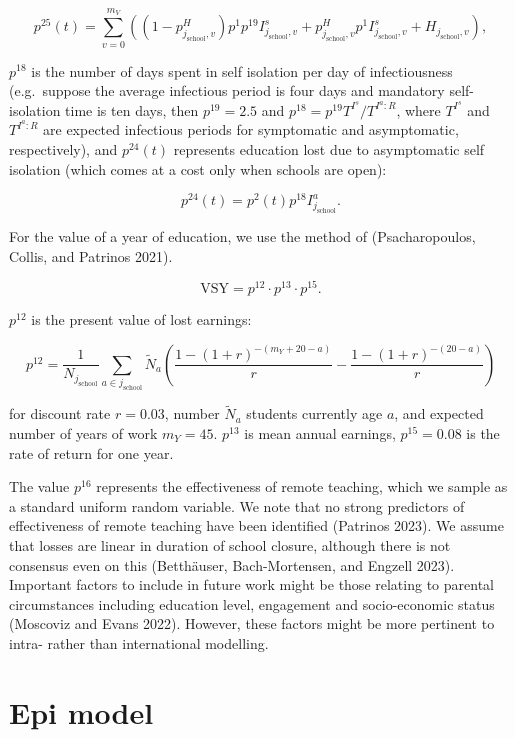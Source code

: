 \documentclass[
]{article}
\begin{document}
\[p^{25}(t)=\sum_{v=0}^{m_V}\left((1-p^H_{j_{\text{school}},v})p^1p^{19}I_{j_{\text{school}},v}^{s}+p^H_{j_{\text{school}},v}p^1I_{j_{\text{school}},v}^{s}+H_{j_{\text{school}},v}\right),\]

\(p^{18}\) is the number of days spent in self isolation per day of infectiousness (e.g.~suppose the average infectious period is four days and mandatory self-isolation time is ten days, then \(p^{19}=2.5\) and \(p^{18}=p^{19}T^{I^s}/T^{I^a:R}\), where \(T^{I^s}\) and \(T^{I^a:R}\) are expected infectious periods for symptomatic and asymptomatic, respectively), and \(p^{24}(t)\) represents education lost due to asymptomatic self isolation (which comes at a cost only when schools are open):

\[p^{24}(t)=p^2(t)p^{18}I_{j_{\text{school}}}^{a}.\]

For the value of a year of education, we use the method of (Psacharopoulos, Collis, and Patrinos 2021).

\[\text{VSY} =  p^{12}\cdot p^{13}\cdot p^{15}.\]

\(p^{12}\) is the present value of lost earnings:

\[p^{12} = \frac{1}{N_{j_{\text{school}}}}\sum_{a\in j_{\text{school}}}\tilde{N}_a\left( \frac{1-(1+r)^{-(m_Y+20-a)}}{r} -  \frac{1-(1+r)^{-(20-a)}}{r}\right)\]

for discount rate \(r=0.03\), number \(\tilde{N}_a\) students currently age \(a\), and expected number of years of work \(m_Y=45\). \(p^{13}\) is mean annual earnings, \(p^{15}=0.08\) is the rate of return for one year.

The value \(p^{16}\) represents the effectiveness of remote teaching, which we sample as a standard uniform random variable. We note that no strong predictors of effectiveness of remote teaching have been identified (Patrinos 2023). We assume that losses are linear in duration of school closure, although there is not consensus even on this (Betthäuser, Bach-Mortensen, and Engzell 2023). Important factors to include in future work might be those relating to parental circumstances including education level, engagement and socio-economic status (Moscoviz and Evans 2022). However, these factors might be more pertinent to intra- rather than international modelling.

\hypertarget{epi-model}{%
\section{Epi model}\label{epi-model}}
\end{document}
